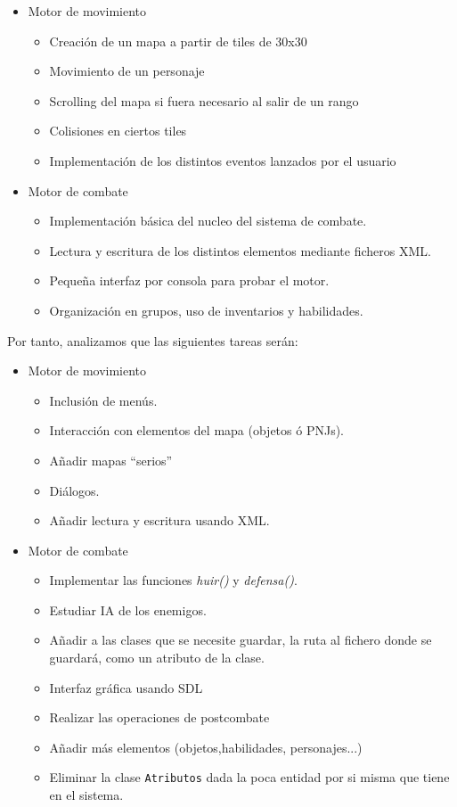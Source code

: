 \documentclass[a4paper,10pt]{article}
\begin{document}
\begin{itemize}
\item Motor de movimiento
  \begin{itemize}
  \item Creación de un mapa a partir de tiles de 30x30
  \item Movimiento de un personaje
  \item Scrolling del mapa si fuera necesario al salir de un rango
  \item Colisiones en ciertos tiles
  \item Implementación de los distintos eventos lanzados por el usuario
  \end{itemize}

\item Motor de combate
  \begin{itemize}
  \item Implementación básica del nucleo del sistema de combate.
  \item Lectura y escritura de los distintos elementos mediante
    ficheros XML.
  \item Pequeña interfaz por consola para probar el motor.
  \item Organización en grupos, uso de inventarios y habilidades.
  \end{itemize}
\end{itemize}

\noindent Por tanto, analizamos que las siguientes tareas serán:

\begin{itemize}
\item Motor de movimiento
  \begin{itemize}
  \item Inclusión de menús.
  \item Interacción con elementos del mapa (objetos ó PNJs).
  \item Añadir mapas ``serios''
  \item Diálogos.
  \item Añadir lectura y escritura usando XML.
  \end{itemize}

\item Motor de combate
  \begin{itemize}
  \item Implementar las funciones \textit{huir()} y \textit{defensa()}.
  \item Estudiar IA de los enemigos.
  \item Añadir a las clases que se necesite guardar, la ruta al fichero
    donde se guardará, como un atributo de la clase.
  \item Interfaz gráfica usando SDL
  \item Realizar las operaciones de postcombate
  \item Añadir más elementos (objetos,habilidades, personajes...)
  \item Eliminar la clase \texttt{Atributos} dada la poca entidad por
    si misma que tiene en el sistema.
  \end{itemize}
\end{itemize}
\end{document}
